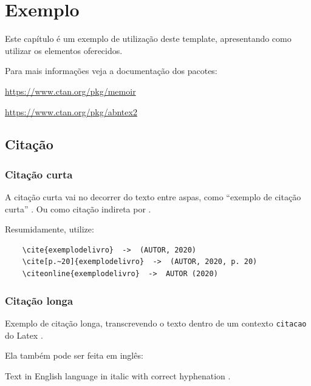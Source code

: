 \chapter{Exemplo}\label{texto:exemplo}

Este capítulo é um exemplo de utilização deste template, apresentando como utilizar os elementos oferecidos.

Para mais informações veja a documentação dos pacotes:

\begin{incisos}
    \item \url{https://www.ctan.org/pkg/memoir}
    \item \url{https://www.ctan.org/pkg/abntex2}
\end{incisos}

\section{Citação}\label{texto:exemplo:citacao}

\subsection{Citação curta}\label{texto:exemplo:citacao:curta}

A citação curta vai no decorrer do texto entre aspas, como ``exemplo de citação curta'' \cite[p.~20]{exemplodelivro}. Ou como citação indireta por .

Resumidamente, utilize:

\begin{verbatim}
    \cite{exemplodelivro}  ->  (AUTOR, 2020)
    \cite[p.~20]{exemplodelivro}  ->  (AUTOR, 2020, p. 20)
    \citeonline{exemplodelivro}  ->  AUTOR (2020)
\end{verbatim}

\subsection{Citação longa}\label{texto:exemplo:citacao:longa}

\begin{citacao}
    Exemplo de citação longa, transcrevendo o texto dentro de um contexto \texttt{citacao} do Latex \cite[p.~20-21]{exemplodelivro}.
\end{citacao}

Ela também pode ser feita em inglês:

\begin{citacao}[english]
    Text in English language in italic with correct hyphenation \cite[p.~20]{exemplodelivro}.
\end{citacao}

